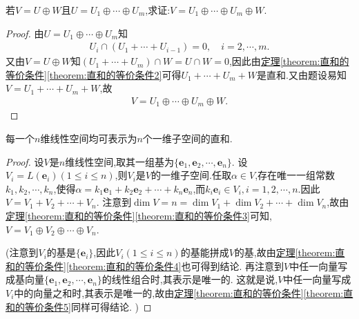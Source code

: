 \documentclass[../../main.tex]{subfiles}%
\begin{document}
\begin{proposition}\label{proposition:直和的传递性}
若\(V = U\oplus W\)且\(U = U_1\oplus \cdots \oplus U_m\),求证:\(V =U_1\oplus \cdots \oplus U_m\oplus W\). 
\end{proposition}
\begin{proof}
由\(U = U_1\oplus \cdots \oplus U_m\)知
\begin{align*}
U_i\cap (U_1+\cdots +U_{i-1}) = 0,\quad i=2,\cdots,m.
\end{align*}
又由\(V = U\oplus W\)知\((U_1+ \cdots + U_m)\cap W=U\cap W = 0\),因此由\hyperref[theorem:直和的等价条件2]{定理\ref{theorem:直和的等价条件}\ref{theorem:直和的等价条件2}}可得\(U_1+ \cdots + U_m+ W\)是直和.又由题设易知$V=U_1+ \cdots + U_m+ W$,故
\begin{align*}
V = U_1\oplus \cdots \oplus U_m\oplus W.
\end{align*}

\end{proof}

\begin{proposition}\label{proposition:n维线性空间的一维直和分解}
每一个\(n\)维线性空间均可表示为\(n\)个一维子空间的直和.
\end{proposition}
\begin{proof}
设\(V\)是\(n\)维线性空间,取其一组基为\(\{\boldsymbol{e}_1,\boldsymbol{e}_2,\cdots,\boldsymbol{e}_n\}\). 设\(V_i = L(\boldsymbol{e}_i)(1\leqslant  i\leqslant  n)\),则\(V_i\)是\(V\)的一维子空间.任取$\alpha\in V$,存在唯一一组常数$k_1,k_2,\cdots,k_n$,使得$\alpha =k_1\boldsymbol{e}_1+k_2\boldsymbol{e}_2+\cdots +k_n\boldsymbol{e}_n$,而$k_i\boldsymbol{e}_i\in V_i,i=1,2,\cdots ,n.$因此\(V = V_1 + V_2+\cdots+V_n\). 注意到\(\dim V = n=\dim V_1+\dim V_2+\cdots+\dim V_n\),故由\hyperref[theorem:直和的等价条件3]{定理\ref{theorem:直和的等价条件}\ref{theorem:直和的等价条件3}}可知,\(V = V_1\oplus V_2\oplus\cdots\oplus V_n\). 

(注意到\(V_i\)的基是\(\{\boldsymbol{e}_i\}\),因此\(V_i(1\leqslant  i\leqslant  n)\)的基能拼成\(V\)的基,故由\hyperref[theorem:直和的等价条件4]{定理\ref{theorem:直和的等价条件}\ref{theorem:直和的等价条件4}}也可得到结论. 再注意到\(V\)中任一向量写成基向量\(\{\boldsymbol{e}_1,\boldsymbol{e}_2,\cdots,\boldsymbol{e}_n\}\)的线性组合时,其表示是唯一的. 这就是说,\(V\)中任一向量写成\(V_i\)中的向量之和时,其表示是唯一的,故由\hyperref[theorem:直和的等价条件5]{定理\ref{theorem:直和的等价条件}\ref{theorem:直和的等价条件5}}同样可得结论. )
\end{proof}
\end{document}
